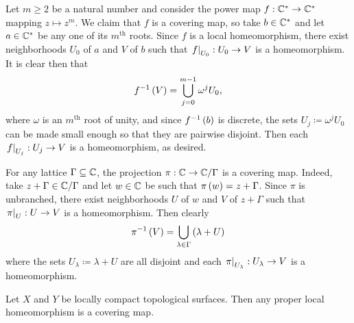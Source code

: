 \documentclass[../Moduli_Spaces_of_Riemann_Surfaces.tex]{subfiles}
\begin{document}
    \begin{example}
        Let $m\geq2$ be a natural number and consider the power map $f:\mathbb{C}^\ast\to\mathbb{C}^\ast$ mapping $z\mapsto z^m$. We claim that $f$ is a covering map, so take $b\in\mathbb{C}^\ast$ and let $a\in\mathbb{C}^\ast$ be any one of its $m^\textrm{th}$ roots. Since $f$ is a local homeomorphism, there exist neighborhoods $U_0$ of $a$ and $V$ of $b$ such that $\left.f\right|_{U_0}:U_0\to V$ is a homeomorphism. It is clear then that
        \vspace{-0.05in}
        \begin{equation*}
            f^{-1}\left(V\right)=\bigcup_{j=0}^{m-1}\omega^jU_0,
        \end{equation*}
        where $\omega$ is an $m^\textrm{th}$ root of unity, and since $f^{-1}\left(b\right)$ is discrete, the sets $U_j\coloneqq\omega^jU_0$ can be made small enough so that they are pairwise disjoint. Then each $\left.f\right|_{U_j}:U_j\to V$ is a homeomorphism, as desired.\exqed
    \end{example}
    \begin{example}
        For any lattice $\Gamma\subseteq\mathbb{C}$, the projection $\pi:\mathbb{C}\to\mathbb{C}/\Gamma$ is a covering map. Indeed, take $z+\Gamma\in\mathbb{C}/\Gamma$ and let $w\in\mathbb{C}$ be such that $\pi\left(w\right)=z+\Gamma$. Since $\pi$ is unbranched, there exist neighborhoods $U$ of $w$ and $V$ of $z+\Gamma$ such that $\left.\pi\right|_{U}:U\to V$ is a homeomorphism. Then clearly
        \begin{equation*}
            \pi^{-1}\left(V\right)=\bigcup_{\lambda\in\Gamma}\left(\lambda+U\right)
        \end{equation*}
        where the sets $U_\lambda\coloneqq\lambda+U$ are all disjoint and each $\left.\pi\right|_{U_\lambda}:U_\lambda\to V$ is a homeomorphism.\exqed
    \end{example}
    \begin{theorem}
        Let $X$ and $Y$ be locally compact topological surfaces. Then any proper local homeomorphism is a covering map.
    \end{theorem}
\end{document}
